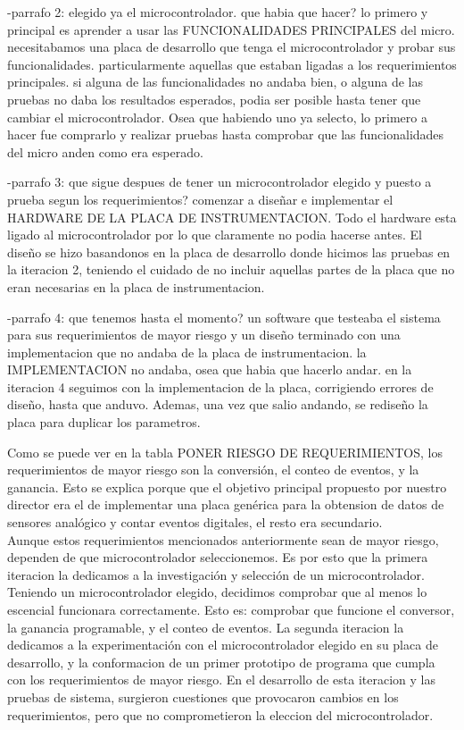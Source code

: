 -parrafo 2:
elegido ya el microcontrolador. que habia que hacer? lo primero y principal es aprender a usar las FUNCIONALIDADES PRINCIPALES del micro. necesitabamos una placa de desarrollo que tenga el microcontrolador y probar sus funcionalidades. particularmente aquellas que estaban ligadas a los requerimientos principales. si alguna de las funcionalidades no andaba bien, o alguna de las pruebas no daba los resultados esperados, podia ser posible hasta tener que cambiar el microcontrolador. Osea que habiendo uno ya selecto, lo primero a hacer fue comprarlo y realizar pruebas hasta comprobar que las funcionalidades del micro anden como era esperado.

-parrafo 3:
que sigue despues de tener un microcontrolador elegido y puesto a prueba segun los requerimientos? comenzar a diseñar e implementar el HARDWARE DE LA PLACA DE INSTRUMENTACION. Todo el hardware esta ligado al microcontrolador por lo que claramente no podia hacerse antes. El diseño se hizo basandonos en la placa de desarrollo donde hicimos las pruebas en la iteracion 2, teniendo el cuidado de no incluir aquellas partes de la placa que no eran necesarias en la placa de instrumentacion.


-parrafo 4:
que tenemos hasta el momento? un software que testeaba el sistema para sus requerimientos de mayor riesgo y un diseño terminado con una implementacion que no andaba de la placa de instrumentacion. la IMPLEMENTACION no andaba, osea que habia que hacerlo andar. en la iteracion 4 seguimos con la implementacion de la placa, corrigiendo errores de diseño, hasta que anduvo. Ademas, una vez que salio andando, se rediseño la placa para duplicar los parametros.




Como se puede ver en la tabla PONER RIESGO DE REQUERIMIENTOS, los requerimientos de mayor riesgo son la conversión, el conteo de eventos, y la ganancia. Esto se explica porque que el objetivo principal propuesto por nuestro director era el de implementar una placa genérica para la obtension de datos de sensores analógico y contar eventos digitales, el resto era secundario. \\

Aunque estos requerimientos mencionados anteriormente sean de mayor riesgo, dependen de que microcontrolador seleccionemos. Es por esto que la primera iteracion la dedicamos a la investigación y selección de un microcontrolador. \\

Teniendo un microcontrolador elegido, decidimos comprobar que al menos lo escencial funcionara correctamente. Esto es: comprobar que funcione el conversor, la ganancia programable, y el conteo de eventos. La segunda iteracion la dedicamos a la experimentación con el microcontrolador elegido en su placa de desarrollo, y la conformacion de un primer prototipo de programa que cumpla con los requerimientos de mayor riesgo. En el desarrollo de esta iteracion y las pruebas de sistema, surgieron cuestiones que provocaron cambios en los requerimientos, pero que no comprometieron la eleccion del microcontrolador.  \\

